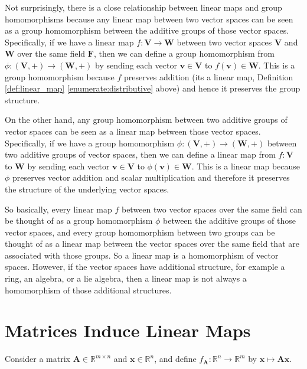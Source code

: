 \documentclass{article}
\theoremstyle{definition}
\begin{document}
\noindent
Not surprisingly, there is a close relationship between linear
maps and group homomorphisms because any linear map between two
vector spaces can be seen as a group homomorphism between the
additive groups of those vector spaces. Specifically, if we have
a linear map $f: \mathbf{V} \to \mathbf{W}$ between two vector
spaces $\mathbf{V}$ and $\mathbf{W}$ over the same field
$\mathbf{F}$, then we can define a group homomorphism from
$\phi:(\mathbf{V},+) \to (\mathbf{W},+)$ by sending each vector
$\mathbf{v} \in \mathbf{V}$ to $f(\mathbf{v}) \in \mathbf{W}$.
This is a group homomorphism because $f$ preserves addition (its
a linear map, Definition \ref{def:linear_map}
\ref{enumerate:distributive} above) and hence it preserves the
group structure.

\bigskip
\noindent
On the other hand, any group homomorphism between two additive
groups of vector spaces can be seen as a linear map between those
vector spaces. Specifically, if we have a group homomorphism
$\phi: (\mathbf{V}, +) \to (\mathbf{W}, +)$ between two additive
groups of vector spaces, then we can define a linear map from $f:
\mathbf{V}$ to $\mathbf{W}$ by sending each vector $\mathbf{v}
\in \mathbf{V}$ to $\phi(\mathbf{v}) \in \mathbf{W}$. This is a
linear map because $\phi$ preserves vector addition and scalar
multiplication and therefore it preserves the structure of the
underlying vector spaces.

\bigskip
\noindent
So basically, every linear map $f$ between two vector spaces over
the same field can be thought of as a group homomorphism $\phi$
between the additive groups of those vector spaces, and every
group homomorphism between two groups can be thought of as a
linear map between the vector spaces over the same field that are
associated with those groups. So a linear map is a homomorphism of 
vector spaces. However, if the vector spaces have additional structure, 
for example a ring, an algebra, or a lie algebra, then a linear map 
is not always a homomorphism of those additional structures.
%
%
%
\section{Matrices Induce Linear Maps}
Consider a matrix $\bm{A} \in \mathbb{R}^{m \times n}$ and
$\mathbf{x} \in \mathbb{R}^{n}$, and define $f_{\bm{A}}:
\mathbb{R}^{n} \rightarrow \mathbb{R}^{m}$ by $\mathbf{x}
\mapsto \bm{A}\mathbf{x}$.
\end{document}

